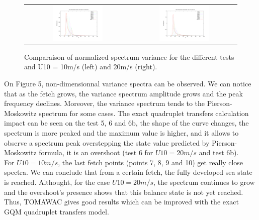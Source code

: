 \begin{figure}[h!]
\begin{tabular}{cc}
    \includegraphics[width=0.5\textwidth]{variance_ad_free_mesh_t6b_v10.pdf} & \includegraphics[width=0.5\textwidth]{variance_ad_free_mesh_t6b_v20.pdf}\\
  \end{tabular}
      \caption{Comparaison of normalized spectrum variance for the different tests and U10 = 10m/s (left) and 20m/s (right).}
\end{figure}
On Figure 5, non-dimensionnal variance spectra can be observed. We can notice that as the fetch grows, the variance spectrum amplitude grows and the peak frequency declines. Moreover, the variance spectrum tends to the Pierson-Moskowitz spectrum for some cases. The exact quadruplet transfers calculation impact can be seen on the test 5, 6 and 6b, the shape of the curve changes, the spectrum is more peaked and the maximum value is higher, and it allows to observe a spectrum peak overstepping the state value predicted by Pierson-Moskowitz formula, it is an overshoot (test 6 for $U10 = 20m/s$ and test 6b).\\
For $U10 = 10m/s$, the last fetch points (points 7, 8, 9 and 10) get really close spectra. We can conclude that from a certain fetch, the fully developed sea state is reached. Althought, for the case $U10 = 20m/s$, the spectrum continues to grow and the overshoot's presence shows that this balance state is not yet reached. Thus, TOMAWAC gives good results which can be improved with the exact GQM quadruplet transfers model.

